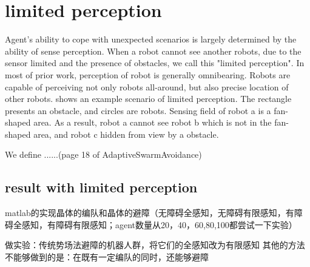 \section{limited perception}

Agent's ability to cope with unexpected scenarios is largely determined by the ability of sense perception\cite{Distributed adaptive swarm for obstacle avoidance}. 
When a robot cannot see another robots, due to the sensor limited and the presence of obstacles, we call this "limited perception".
In most of prior work, perception of robot is generally omnibearing. 
Robots are capable of perceiving not only robots all-around, but also precise location of other robots\cite{}.
\figurename{} shows an example scenario of  limited perception. The rectangle presents an obstacle, and circles are robots. 
Sensing field of robot a is a fan-shaped area. As a result, robot a cannot see robot b which is not in the fan-shaped area, and robot c hidden from view by a obstacle.

We define ......(page 18 of AdaptiveSwarmAvoidance)

\subsection{result with limited perception}
matlab的实现晶体的编队和晶体的避障（无障碍全感知，无障碍有限感知，有障碍全感知，有障碍有限感知；agent数量从20，40，60,80,100都尝试一下实验）

做实验：传统势场法避障的机器人群，将它们的全感知改为有限感知
其他的方法不能够做到的是：在既有一定编队的同时，还能够避障
